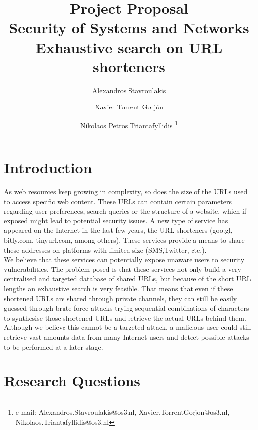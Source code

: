 \documentclass{article}
\author{Alexandros Stavroulakis%
}
\author{Xavier Torrent Gorj\'{o}n%
}
\author{Nikolaos Petros Triantafyllidis%
  \thanks{e-mail: Alexandros.Stavroulakis@os3.nl, Xavier.TorrentGorjon@os3.nl, Nikolaos.Triantafyllidis@os3.nl}}
\affil{University of Amsterdam, System and Network Engineering (MSc)}
\title{ Project Proposal \\ Security of Systems and Networks\\ Exhaustive search on URL shorteners}
\begin{document}
\maketitle


\section{Introduction}
As web resources keep growing in complexity, so does the size of the URLs used to access specific web content. These URLs can contain certain parameters regarding user preferences, search queries or the structure of a website, which if exposed might lead to potential security issues. A new type of service has appeared on the Internet in the last few years, the URL shorteners (goo.gl, bitly.com,  tinyurl.com, among others). These services provide a means to share these addresses on platforms with limited size (SMS,Twitter, etc.). \\
We believe that these services can potentially expose unaware users to security vulnerabilities. The problem posed is that these services not only build a very centralised and targeted database of shared URLs, but because of the short URL lengths an exhaustive search is very feasible. That means that even if these shortened URLs are shared through private channels, they can still be easily guessed through brute force attacks trying sequential combinations of characters to synthesise those shortened URLs and retrieve the actual URLs behind them. Although we believe this cannot be a targeted attack, a malicious user could still retrieve vast amounts data from many Internet users and detect possible attacks to be performed at a later stage. 

\newpage
\section{Research Questions}
\end{document}
